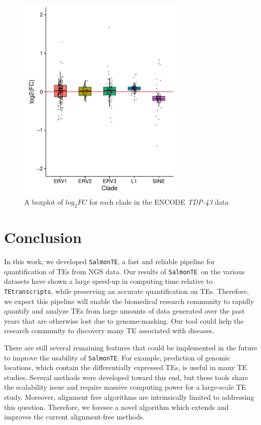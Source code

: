 \documentclass[wsdraft]{ws-procs11x85}
\newcommand{\TEtranscripts}{\texttt{TEtranscripts}}
\newcommand{\SalmonTE}{\texttt{SalmonTE}}
\begin{document}
\begin{figure}[h]
\centerline{
\includegraphics[width=8cm]{boxplot-clade-k562}
}
\caption{A boxplot of $log_{2}FC$ for each clade in the ENCODE \textit{TDP-43} data}
\label{aba:fig5}
\end{figure}

\section{Conclusion}


In this work, we developed \SalmonTE, a fast and reliable pipeline for quantification of TEs from 
NGS data.
Our results of \SalmonTE~on the various datasets have shown a large speed-up in computing time relative to \TEtranscripts, 
while preserving an accurate quantification on TEs. 
Therefore, we expect this pipeline will enable the biomedical research community to rapidly quantify and analyze TEs from large amounts of data generated over the past years that are otherwise lost due to genome-masking. Our tool could help the research community to discovery many TE associated with diseases.

There are still several remaining features that could be implemented in the future to improve the usability of \SalmonTE. 
For example, prediction of genomic locations, which contain the differentially expressed TEs, is useful in many TE studies. Several methods were developed toward this end\cite{de2017identifying,criscione2014transcriptional}, but these tools share the scalability issue and require massive computing power for a large-scale TE study. 
Moreover, alignment free algorithms are intrinsically limited to addressing this question. 
Therefore, we foresee a novel algorithm which extends and improves the current alignment-free methods.
\end{document}
